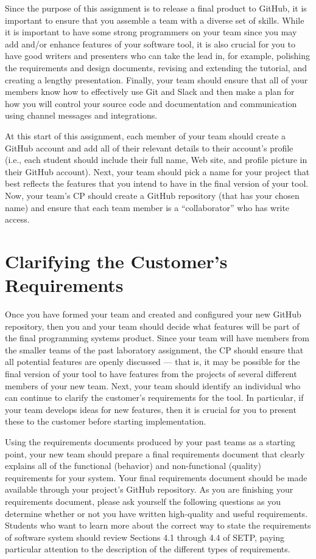 Since the purpose of this assignment is to release a final product to GitHub, it is important to ensure that you
assemble a team with a diverse set of skills. While it is important to have some strong programmers on your team since
you may add and/or enhance features of your software tool, it is also crucial for you to have good writers and
presenters who can take the lead in, for example, polishing the requirements and design documents, revising and
extending the tutorial, and creating a lengthy presentation.  Finally, your team should ensure that all of your members
know how to effectively use Git and Slack and then make a plan for how you will control your source code and
documentation and communication using channel messages and integrations.

At this start of this assignment, each member of your team should create a GitHub account and add all of their relevant
details to their account's profile (i.e., each student should include their full name, Web site, and profile picture in
their GitHub account).  Next, your team should pick a name for your project that best reflects the features that you
intend to have in the final version of your tool. Now, your team's CP should create a GitHub repository (that has your
chosen name) and ensure that each team member is a ``collaborator'' who has write access.

\section*{Clarifying the Customer's Requirements}

Once you have formed your team and created and configured your new GitHub repository, then you and your team should
decide what features will be part of the final programming systems product. Since your team will have members from the
smaller teams of the past laboratory assignment, the CP should ensure that all potential features are openly discussed
--- that is, it may be possible for the final version of your tool to have features from the projects of several 
different members of your new team. Next, your team should identify an individual who can continue to clarify the
customer's requirements for the tool. In particular, if your team develops ideas for new features, then it is crucial
for you to present these to the customer before starting implementation.

Using the requirements documents produced by your past teams as a starting point, your new team should prepare a final
requirements document that clearly explains all of the functional (behavior) and non-functional (quality) requirements
for your system. Your final requirements document should be made available through your project's GitHub repository. As
you are finishing your requirements document, please ask yourself the following questions as you determine whether or
not you have written high-quality and useful requirements. Students who want to learn more about the correct way to state
the requirements of software system should review Sections 4.1 through 4.4 of SETP, paying particular attention to the
description of the different types of requirements.

